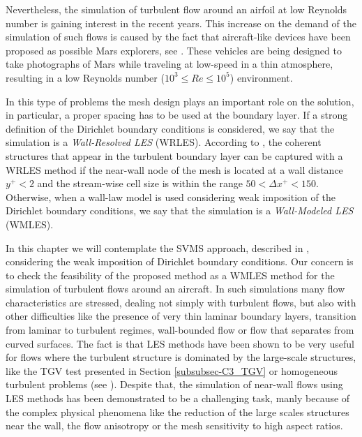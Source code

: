 Nevertheless, the simulation of turbulent flow around an airfoil at low Reynolds number is gaining interest in the recent years. This increase on the demand of the simulation of such flows is caused by the fact that aircraft-like devices have been proposed as possible Mars explorers, see \cite{kojima_large-eddy_2013,smith_mars_????,anyoji_low_????}. These vehicles are being designed to take photographs of Mars while traveling at low-speed in a thin atmosphere, resulting in a low Reynolds number ($ 10^3\le Re\le10^5 $) environment.

In this type of problems the mesh design plays an important role on the solution, in particular, a proper spacing has to be used at the boundary layer. If a strong definition of the Dirichlet boundary conditions is considered, we say that the simulation is a \textit{Wall-Resolved LES} (WRLES). According to \cite{piomelli_large-eddy_1996}, the coherent structures that appear in the turbulent boundary layer can be captured with a WRLES method if the near-wall node of the mesh is located at a wall distance $y^+<2$ and the stream-wise cell size is within the range $50<\Delta x^+<150$. Otherwise, when a wall-law model is used considering weak imposition of the Dirichlet boundary conditions, we say that the simulation is a \textit{Wall-Modeled LES} (WMLES).

In this chapter we will contemplate the SVMS approach, described in , considering the weak imposition of Dirichlet boundary conditions. Our concern is to check the feasibility of the proposed method as a WMLES method for the simulation of turbulent flows around an aircraft. In such simulations many flow characteristics are stressed, dealing not simply with turbulent flows, but also with other difficulties like the presence of very thin laminar boundary layers, transition from laminar to turbulent regimes, wall-bounded flow or flow that separates from curved surfaces. The fact is that LES methods have been shown to be very useful for flows where the turbulent structure is dominated by the large-scale structures, like the TGV test presented in Section \ref{subsubsec-C3_TGV} or homogeneous turbulent problems (see \cite{colomes_assessment_2015}). Despite that, the simulation of near-wall flows using LES methods has been demonstrated to be a challenging task, manly because of the complex physical phenomena like the reduction of the large scales structures near the wall, the flow anisotropy or the mesh sensitivity to high aspect ratios. 

